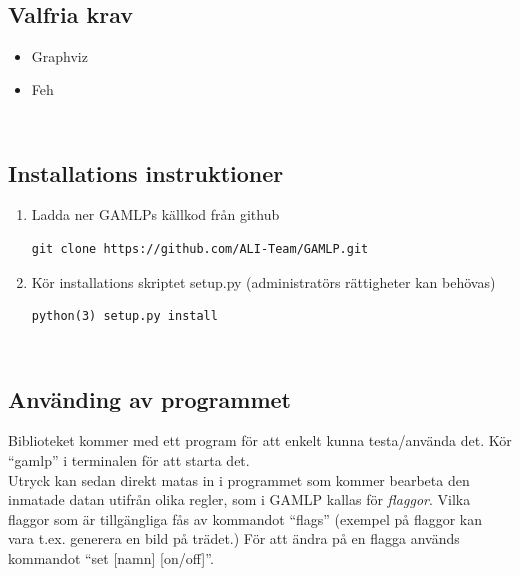 \documentclass[12pt,a4paper]{article}
\begin{document}
\begin{appendices}
\subsection{\\Valfria krav}
\begin{itemize}
  \item Graphviz
  \item Feh
\end{itemize}
\subsection{\\Installations instruktioner}
\begin{enumerate}
  \item Ladda ner GAMLPs källkod från github \begin{verbatim}git clone https://github.com/ALI-Team/GAMLP.git\end{verbatim}
  \item Kör installations skriptet setup.py (administratörs rättigheter kan behövas) \begin{verbatim}python(3) setup.py install\end{verbatim}
\end{enumerate}
\subsection{\\Använding av programmet}
Biblioteket kommer med ett program för att enkelt kunna testa/använda det. Kör ``gamlp'' i terminalen för att starta det.\\
Utryck kan sedan direkt matas in i programmet som kommer bearbeta den inmatade datan utifrån olika regler, som i GAMLP kallas för \textit{flaggor}. Vilka flaggor som är tillgängliga fås av kommandot ``flags'' (exempel på flaggor kan vara t.ex. generera en bild på trädet.)  För att ändra på en flagga används kommandot ``set [namn] [on/off]''.
\end{appendices}
\end{document}
